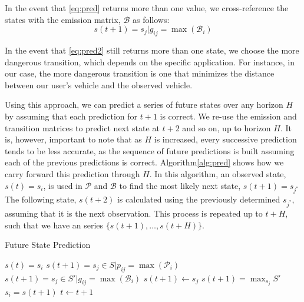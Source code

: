 \documentclass[letterpaper, 10 pt, conference]{ieeeconf}  %
\newcommand\NB[1]{$\spadesuit$\footnote{NB: #1}}
\begin{document}
In the event that \eqref{eq:pred} returns more than one value, we cross-reference the states with the emission matrix, $\mathcal{B}$ as follows: 
\begin{equation} \label{eq:pred2}
    s(t+1)=s_j\vert g_{ij} = \max(\mathcal{B}_i)    
\end{equation}


In the event that \eqref{eq:pred2} still returns more than one state, we choose the more dangerous transition, which depends on the specific application. For instance, in our case, the more dangerous transition is one that minimizes the distance between our user's vehicle and the observed vehicle.

Using this approach, we can predict a series of future states over any horizon $H$ by assuming that each prediction for $t+1$ is correct. We re-use the emission and transition matrices to predict next state at $t+2$ and so on, up to horizon $H$. It is, however, important to note that as $H$ is increased, every successive prediction tends to be less accurate, as the sequence of future predictions is built assuming each of the previous predictions is correct.
Algorithm\ref{alg:pred} shows how we carry forward this prediction through $H$.%
In this algorithm, an observed state, $s(t) = s_i$, is used in %
$\mathcal P$ and $\mathcal B$ to find the most likely next state, $s(t+1) = s_{j^*}$ %
The following state, $s(t+2)$ is calculated using the previously determined $s_{j^*}$, assuming that it is the next observation. This process is repeated up to $t+H$, such that we have an series $\{s(t+1),\ldots,s(t+H)\}$.

\begin{algorithm}[ht!]
\caption{Future State Prediction} \label{alg:pred}
\begin{algorithmic}[1]
\STATE $s(t) = s_i$
\STATE $s(t+1) = s_j \in S \vert p_{ij}=\max(\mathcal{P}_i)$
\STATE $s(t+1)=s_j\in S'\vert g_{ij} = \max(\mathcal{B}_i)$
\STATE $s(t+1) \gets s_{j}$
\STATE $s(t+1) = \max_{s_j}S'$
\ENDIF
\ENDIF
\STATE $s_i = s(t+1)$
\STATE $t \gets t+1$
\ENDWHILE
\end{algorithmic}
\end{algorithm}
\end{document}
